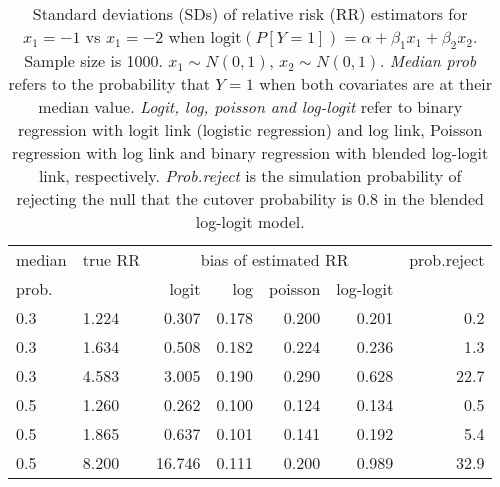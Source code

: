 \documentclass[12pt,a4paper]{article}
\begin{document}
\begin{table}[H] 
\small\sf\centering 
\caption{Standard deviations (SDs) of relative risk (RR) estimators for $x_1=-1$ vs $x_1=-2$ when $\mbox{logit}(P[Y=1])=\alpha+\beta_1 x_1 + \beta_2 x_2$. Sample size is 1000. $x_1 \sim $$N(0,1)$, $x_2 \sim N(0,1)$. {\it Median prob} refers to the probability that $Y=1$ when both covariates are at their median value. {\it Logit, log, poisson and log-logit} refer to binary regression with logit link (logistic regression) and log link, Poisson regression with log link and binary regression with blended log-logit link, respectively. {\it Prob.reject} is the simulation probability of rejecting the null that the cutover probability is $0.8$ in the blended log-logit model.} 
\begin{tabular}{llrrrrr} 
\toprule 
median & true RR & \multicolumn{4}{c}{bias of estimated RR} & prob.reject \\ 
prob. & & logit & log & poisson & log-logit  & \\ \midrule 
0.3 & 1.224 &  0.307 & 0.178 & 0.200 & 0.201 &  0.2 \\  
0.3 & 1.634 &  0.508 & 0.182 & 0.224 & 0.236 &  1.3 \\  
0.3 & 4.583 &  3.005 & 0.190 & 0.290 & 0.628 & 22.7 \\  
0.5 & 1.260 &  0.262 & 0.100 & 0.124 & 0.134 &  0.5 \\  
0.5 & 1.865 &  0.637 & 0.101 & 0.141 & 0.192 &  5.4 \\  
0.5 & 8.200 & 16.746 & 0.111 & 0.200 & 0.989 & 32.9 \\  
\bottomrule 
\end{tabular} 
\end{table} 
\end{document}
